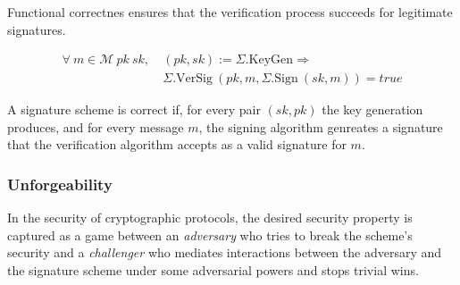 %
Functional correctnes ensures that the verification process
succeeds for legitimate signatures.
%
\begin{definition}
  \label{def:sig:correct}
  \begin{align*}
  \forall ~ m\in\mathcal{M} ~ pk ~ sk, ~ & (pk,sk) := \Sigma.\text{KeyGen} \Rightarrow\\
  & \Sigma.\text{VerSig} \: (pk, m, \Sigma.\text{Sign} \: (sk,m)) = true
  \end{align*}
\end{definition}
%
A signature scheme is correct if,
for every pair $(sk, pk)$ the key generation produces, and
for every message $m$, the signing algorithm genreates a
signature that the verification algorithm accepts as a
valid signature for $m$.
%

\subsubsection{Unforgeability}
%
%
In the security of cryptographic protocols, the desired security property is captured as a game between 
an \emph{adversary} who tries to break the scheme's security 
and a \emph{challenger} who mediates interactions between the adversary and the signature 
scheme under some adversarial powers and stops trivial wins.


